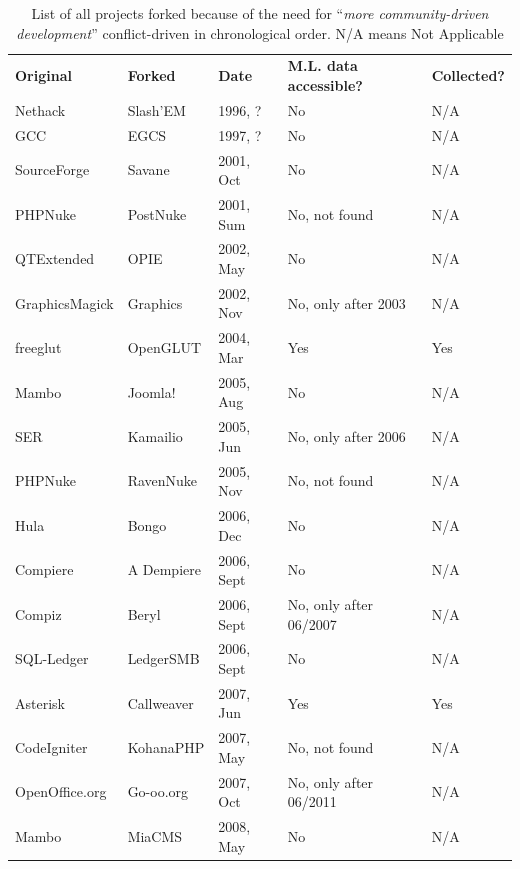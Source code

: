 \documentclass[12pt,letterpaper]{gthesis2}  %
\begin{document}
\begin{appendices}
\pagebreak

\begin{table} [H]
\centering
\caption[List of all projects forked because of the need for ``\textit{more community-driven development}'' conflict-driven]{List of all projects forked because of the need for ``\textit{more community-driven development}'' conflict-driven \cite{Robles} in chronological order. N/A means Not Applicable}
\label{tableProjectsForkedCat2CommunityDriven}
\begin{tabular}{m{} m{} m{} m{} m{}}
\hline\noalign{\smallskip}
\textbf{Original} & \textbf{Forked} & \textbf{Date} & \textbf{M.L. data accessible?} & \textbf{Collected?}\\
\noalign{\smallskip}\hline\noalign{\smallskip}
Nethack & Slash'EM & 1996, ? & No & N/A \\ \hline
GCC & EGCS & 1997, ? & No & N/A \\ \hline
SourceForge & Savane & 2001, Oct & No & N/A \\ \hline
PHPNuke & PostNuke & 2001, Sum & No, not found & N/A \\ \hline
QTExtended & OPIE & 2002, May & No & N/A \\ \hline
GraphicsMagick & Graphics & 2002, Nov  & No, only after 2003 & N/A \\ \hline
freeglut & OpenGLUT & 2004, Mar & Yes & Yes \\ \hline
Mambo & Joomla! & 2005, Aug & No & N/A \\ \hline
SER & Kamailio & 2005, Jun & No, only after 2006 & N/A \\ \hline
PHPNuke & RavenNuke & 2005, Nov & No, not found & N/A \\ \hline
Hula & Bongo & 2006, Dec & No & N/A \\ \hline
Compiere & A Dempiere & 2006, Sept & No & N/A \\ \hline
Compiz & Beryl & 2006, Sept & No, only after 06/2007 & N/A \\ \hline
SQL-Ledger & LedgerSMB & 2006, Sept & No & N/A \\ \hline
Asterisk & Callweaver & 2007, Jun & Yes & Yes \\ \hline
CodeIgniter & KohanaPHP & 2007, May & No, not found & N/A \\ \hline
OpenOffice.org & Go-oo.org & 2007, Oct & No, only after 06/2011 & N/A \\ \hline
Mambo & MiaCMS & 2008, May & No & N/A \\ \hline

\end{tabular}
\end{table}
\end{appendices}
\end{document}
